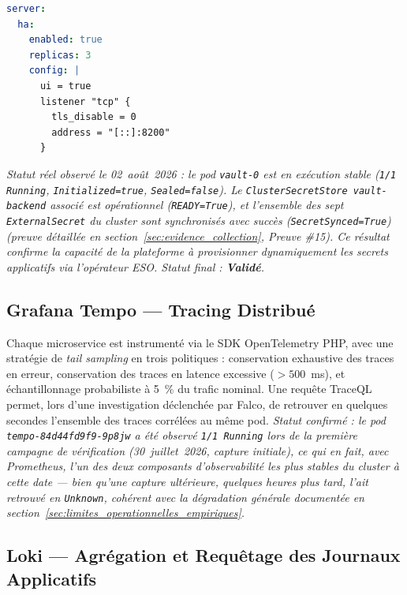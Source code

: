 \begin{lstlisting}[language=yaml, caption={Extrait réel de la configuration Helm haute disponibilité de Vault (\texttt{infra/helm/vault/values-production.yaml})}, label={lst:vault_ha_values_reel}]
server:
  ha:
    enabled: true
    replicas: 3
    config: |
      ui = true
      listener "tcp" {
        tls_disable = 0
        address = "[::]:8200"
      }
\end{lstlisting}

\textit{Statut réel observé le 02~août~2026 : le pod \texttt{vault-0} est en exécution stable (\texttt{1/1 Running}, \texttt{Initialized=true}, \texttt{Sealed=false}). Le \texttt{ClusterSecretStore vault-backend} associé est opérationnel (\texttt{READY=True}), et l'ensemble des sept \texttt{ExternalSecret} du cluster sont synchronisés avec succès (\texttt{SecretSynced=True}) (preuve détaillée en section~\ref{sec:evidence_collection}, Preuve \#15). Ce résultat confirme la capacité de la plateforme à provisionner dynamiquement les secrets applicatifs via l'opérateur ESO. Statut final : \textbf{Validé}.}

\subsection{Grafana Tempo — Tracing Distribué}
Chaque microservice est instrumenté via le SDK OpenTelemetry PHP, avec une stratégie de \textit{tail sampling} en trois politiques : conservation exhaustive des traces en erreur, conservation des traces en latence excessive ($>500$~ms), et échantillonnage probabiliste à 5~\% du trafic nominal. Une requête TraceQL permet, lors d'une investigation déclenchée par Falco, de retrouver en quelques secondes l'ensemble des traces corrélées au même pod. \textit{Statut confirmé : le pod \texttt{tempo-84d44fd9f9-9p8jw} a été observé \texttt{1/1 Running} lors de la première campagne de vérification (30~juillet~2026, capture initiale), ce qui en fait, avec Prometheus, l'un des deux composants d'observabilité les plus stables du cluster à cette date — bien qu'une capture ultérieure, quelques heures plus tard, l'ait retrouvé en \texttt{Unknown}, cohérent avec la dégradation générale documentée en section~\ref{sec:limites_operationnelles_empiriques}.}

\subsection{Loki — Agrégation et Requêtage des Journaux Applicatifs}
\label{subsec:loki_v2}

